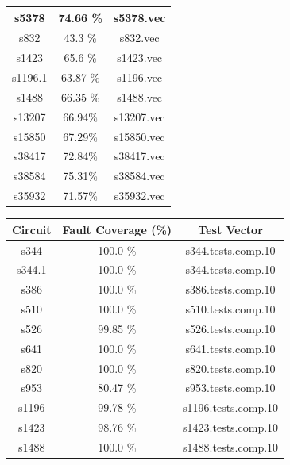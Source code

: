 \documentclass[a4paper,12pt]{article}
\begin{document}
\begin{center}
\begin{tabular}{||c c c||}
\hline
s5378 & 74.66 \%  & s5378.vec \\ 
\hline
s832 & 43.3 \%  & s832.vec \\ 
\hline
s1423 & 65.6 \%  & s1423.vec \\ 
\hline
s1196.1 & 63.87 \%  & s1196.vec \\ 
\hline
s1488 & 66.35 \%  & s1488.vec \\ 
\hline
s13207 & 66.94\% & s13207.vec \\
\hline
s15850 & 67.29\% & s15850.vec \\
\hline
s38417 & 72.84\% & s38417.vec \\
\hline
s38584 & 75.31\% & s38584.vec \\
\hline
s35932 & 71.57\% & s35932.vec \\
\hline
\hline
\end{tabular}
\end{center}


\clearpage

\begin{center}
\begin{tabular}{||c c c||}
\hline
Circuit & Fault Coverage (\%) & Test Vector \\ [0.5ex] 
\hline\hline
s344 & 100.0 \%  & s344.tests.comp.10 \\ 
\hline
s344.1 & 100.0 \%  & s344.tests.comp.10 \\ 
\hline
s386 & 100.0 \%  & s386.tests.comp.10 \\ 
\hline
s510 & 100.0 \%  & s510.tests.comp.10 \\ 
\hline
s526 & 99.85 \%  & s526.tests.comp.10 \\ 
\hline
s641 & 100.0 \%  & s641.tests.comp.10 \\ 
\hline
s820 & 100.0 \%  & s820.tests.comp.10 \\ 
\hline
s953 & 80.47 \%  & s953.tests.comp.10 \\ 
\hline
s1196 & 99.78 \%  & s1196.tests.comp.10 \\ 
\hline
s1423 & 98.76 \%  & s1423.tests.comp.10 \\ 
\hline
s1488 & 100.0 \%  & s1488.tests.comp.10 \\ 

\hline
\hline
\end{tabular}
\end{center}
\end{document}
